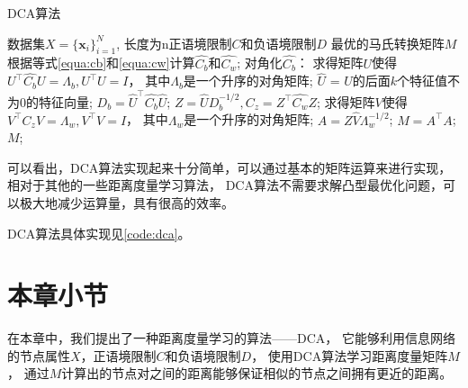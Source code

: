 

        

\begin{algorithm}[htb]
    \caption{DCA算法}
    \label{algo:dca}
    \begin{algorithmic}[1]
        \Require
        数据集$X = \{ \bm{x}_i \}_{i=1}^{N}$,
        长度为n正语境限制$C$和负语境限制$D$        
        \Ensure
        最优的马氏转换矩阵$M$
        \State 根据等式\ref{equa:cb}和\ref{equa:cw}计算$\hat{C_b}$和$\hat{C_w}$;
        \State 对角化$\hat{C_b}$： 
        \State 求得矩阵$U$使得$U^\top \hat{C_b} U = \Lambda_b, U^\top U = I$，
            其中$\Lambda_b$是一个升序的对角矩阵;
        \State $\hat{U}$ = $U$的后面$k$个特征值不为$0$的特征向量;
        \State $D_b = \hat{U}^\top\hat{C_b}\hat{U}$;
        \State $Z = \hat{U}D_b^{-1/2}, C_z = Z^\top\hat{C_w}Z$;
        \State 求得矩阵$V$使得$V^\top C_z V = \Lambda_w, V^\top V = I$，
                其中$\Lambda_w$是一个升序的对角矩阵;
        \State $A = Z\hat{V}\Lambda_w^{-1/2}$; 
        \State $M = A^\top A$; 
        \Return $M$;
    \end{algorithmic}
\end{algorithm}

可以看出，DCA算法实现起来十分简单，可以通过基本的矩阵运算来进行实现，
相对于其他的一些距离度量学习算法，
DCA算法不需要求解凸型最优化问题，可以极大地减少运算量，具有很高的效率。

DCA算法具体实现见\ref{code:dca}。

\section{本章小节}

在本章中，我们提出了一种距离度量学习的算法——DCA，
它能够利用信息网络的节点属性$X$，正语境限制$C$和负语境限制$D$，
使用DCA算法学习距离度量矩阵$M$，
通过$M$计算出的节点对之间的距离能够保证相似的节点之间拥有更近的距离。
